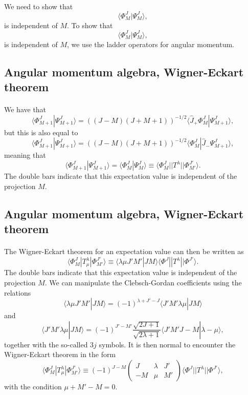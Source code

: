 \documentclass[%
twoside,                 %
final,                   %
10pt]{article}
\begin{document}
\paragraph{}
We need to show that 
\[
\langle \Phi^J_M|\Psi^{J}_{M}\rangle,
\]
is independent of $M$.
To show that 
\[
\langle \Phi^J_M|\Psi^{J}_{M}\rangle,
\]
is independent of $M$, we use the ladder operators for angular momentum.



\subsection*{Angular momentum algebra, Wigner-Eckart theorem}

\paragraph{}
 We have that
\[
\langle \Phi^J_{M+1}|\Psi^{J}_{M+1}\rangle=\left((J-M)(J+M+1)\right)^{-1/2}\langle \hat{J}_{+}\Phi^J_{M}|\Psi^{J}_{M+1}\rangle,
\]
but this is also equal to 
\[
\langle \Phi^J_{M+1}|\Psi^{J}_{M+1}\rangle=\left((J-M)(J+M+1)\right)^{-1/2}\langle \Phi^J_{M}|\hat{J}_{-}\Psi^{J}_{M+1}\rangle,
\]
meaning that
\[
\langle \Phi^J_{M+1}|\Psi^{J}_{M+1}\rangle=\langle \Phi^J_M|\Psi^{J}_{M}\rangle\equiv\langle \Phi^J_{M}||T^{\lambda}||\Phi^{J'}_{M'}\rangle.
\]
The double bars indicate that this expectation value is independent of the projection $M$.



\subsection*{Angular momentum algebra, Wigner-Eckart theorem}

\paragraph{}
The Wigner-Eckart theorem for an expectation value can then be written as 
\[
\langle \Phi^J_M|T^{\lambda}_{\mu}|\Phi^{J'}_{M'}\rangle\equiv\langle \lambda \mu J'M'|JM\rangle\langle \Phi^J||T^{\lambda}||\Phi^{J'}\rangle.
\]
The double bars indicate that this expectation value is independent of the projection $M$.
We can manipulate the Clebsch-Gordan coefficients using the relations
\[
\langle \lambda \mu J'M'|JM\rangle= (-1)^{\lambda+J'-J}\langle J'M'\lambda \mu |JM\rangle 
\]
and
\[
\langle J'M'\lambda \mu |JM\rangle =(-1)^{J'-M'}\frac{\sqrt{2J+1}}{\sqrt{2\lambda+1}}\langle J'M'J-M |\lambda-\mu\rangle,
\]
together with the so-called $3j$ symbols.
It is then normal to encounter the Wigner-Eckart theorem in the form 
\[
\langle \Phi^J_M|T^{\lambda}_{\mu}|\Phi^{J'}_{M'}\rangle\equiv(-1)^{J-M}\left(\begin{array}{ccc}  J & \lambda & J' \\ -M & \mu & M'\end{array}\right)\langle \Phi^J||T^{\lambda}||\Phi^{J'}\rangle,
\]
with the condition $\mu+M'-M=0$.
\end{document}
